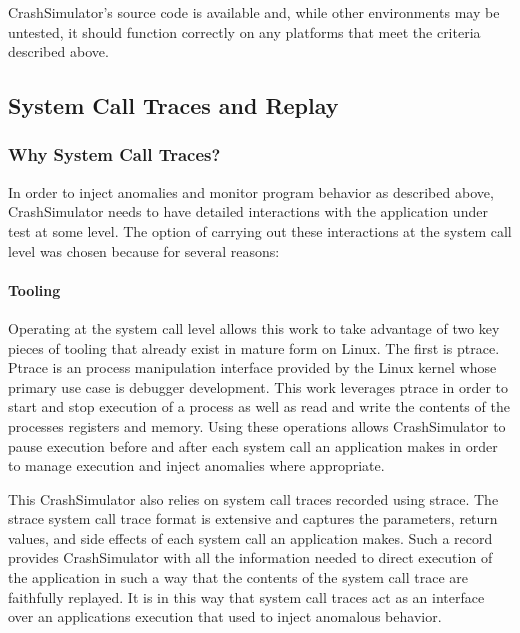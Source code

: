    CrashSimulator's source code is available and, while other environments may be untested, it should function
    correctly on any platforms that meet the criteria described above.

    \subsection{System Call Traces and Replay}

        \subsubsection{Why System Call Traces?}

        In order to inject anomalies and monitor program behavior as described above, CrashSimulator needs to have detailed
        interactions with the application under test at some level.  The option of carrying out these interactions at the
        system call level was chosen because for several reasons:

        \paragraph{Tooling}

        Operating at the system call level allows this work to take advantage of two key pieces of tooling that already
        exist in mature form on Linux.  The first is ptrace. Ptrace is an process manipulation interface provided by the
        Linux kernel whose primary use case is debugger development.  This work leverages ptrace in order to start and stop
        execution of a process as well as read and write the contents of the processes registers and memory.  Using these
        operations allows CrashSimulator to pause execution before and after each system call an application makes in order
        to manage execution and inject anomalies where appropriate.

        This CrashSimulator also relies on system call traces recorded using strace.  The strace system call trace format is
        extensive and captures the parameters, return values, and side effects of each system call an application makes.
        Such a record provides CrashSimulator with all the information needed to direct execution of the application in such
        a way that the contents of the system call trace are faithfully replayed.  It is in this way that system call traces
        act as an interface over an applications execution that used to inject anomalous behavior.

